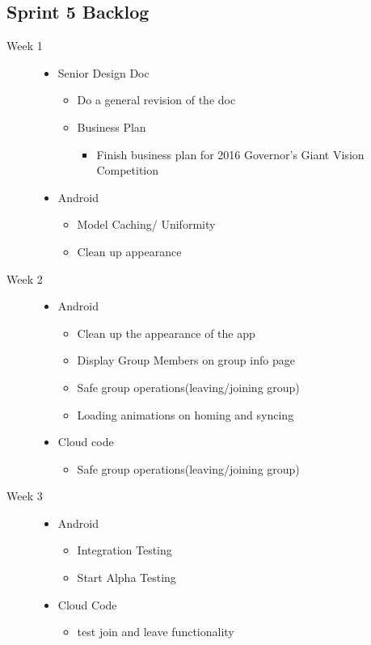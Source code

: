 \subsection{Sprint 5 Backlog}
\begin{description}
	\item[Week 1] \hfill
		\begin{itemize}
		\item Senior Design Doc
		\begin{itemize}
			\item Do a general revision of the doc
		\end{itemize}
		\begin{itemize}
		\item Business Plan
			\begin{itemize}
			\item Finish business plan for 2016 Governor's Giant Vision Competition
			\end{itemize}
		\end{itemize}
		\item Android
		\begin{itemize}
			\item Model Caching/ Uniformity
			\item Clean up appearance
		\end{itemize}
	\end{itemize}
	
  \item[Week 2] \hfill
		\begin{itemize}
		\item Android
		\begin{itemize}
			\item Clean up the appearance of the app
			\item Display Group Members on group info page
			\item Safe group operations(leaving/joining group)
			\item Loading animations on homing and syncing
		\end{itemize}
		\item Cloud code
		\begin{itemize}
			\item Safe group operations(leaving/joining group)
		\end{itemize}
	\end{itemize}
  
  \item[Week 3] \hfill
		\begin{itemize}
		\item Android
		\begin{itemize}
			\item Integration Testing
			\item Start Alpha Testing
		\end{itemize}
		\item Cloud Code
		\begin{itemize}
			\item test join and leave functionality
		\end{itemize}
	\end{itemize}
\end{description}

